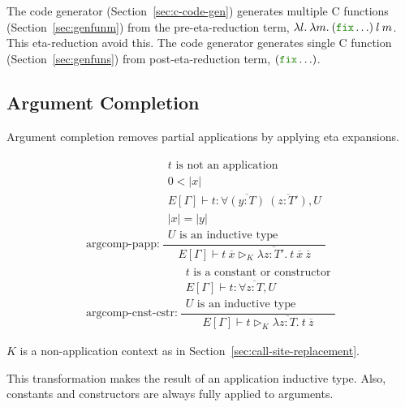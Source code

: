 \documentclass[a4paper,fleqn]{article}
\newcommand{\kwfix}{\mbox{\color{mygreen}\ttfamily fix}}
\newcommand{\lam}[2]{\lambda #1.\:#2}
\newcommand{\secref}[1]{Section~\ref{#1}}
\newcommand{\reltri}{\mathrel{\triangleright}}
\newcommand{\rep}[1]{\overline{#1}}
\begin{document}
The code generator (\secref{sec:c-code-gen}) generates multiple C functions (\secref{sec:genfunm}) from the pre-eta-reduction term, $\lam{l}{\lam{m}{(\kwfix \ldots)\:l\:m}}$.
This eta-reduction avoid this.
The code generator generates single C function (\secref{sec:genfuns}) from post-eta-reduction term, $(\kwfix \ldots)$.

\subsection{Argument Completion}\label{sec:argcomp}
Argument completion removes partial applications by applying eta expansions.

\begin{gather*}
  \text{argcomp-papp:}~
    \dfrac{
      \begin{gathered}
        \text{$t$ is not an application} \\
        0 < |x| \\
        E[\Gamma] \vdash t : \forall \rep{(y{:}T)}\:\rep{(z{:}T')}, U \\
        |x| = |y| \\
        \text{$U$ is an inductive type}
      \end{gathered}
    }{E[\Gamma] \vdash
        t\:\rep{x}
        \reltri_K
        \lam{\rep{z{:}T'}}{t\:\rep{x}\:\rep{z}}
    } \\[1em]
  \text{argcomp-cnst-cstr:}~
    \dfrac{
      \begin{gathered}
        \text{$t$ is a constant or constructor} \\
        E[\Gamma] \vdash t : \forall \rep{z{:}T}, U \\
        \text{$U$ is an inductive type}
      \end{gathered}
    }{E[\Gamma] \vdash
        t
        \reltri_K
        \lam{\rep{z{:}T}}{t\:\rep{z}}
    }
\end{gather*}

$K$ is a non-application context as in \secref{sec:call-site-replacement}.

This transformation makes the result of an application inductive type.
Also, constants and constructors are always fully applied to arguments.
\end{document}
